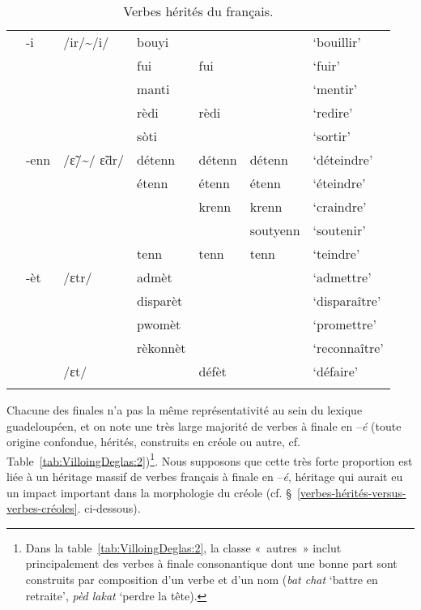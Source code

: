 \documentclass[output=paper]{langsci/langscibook}
\begin{document}
\begin{table}
{\begin{tabular}[c]{lllllll}
  \cline{2-7}
  & -i & /ir/\textasciitilde{}/i/ & bouyi& & &  `bouillir' \\
  & & & fui  & fui  &&`fuir'\\
  & & & manti  & &&`mentir'\\
  & & & rèdi  & rèdi &&`redire'\\
  & & & sòti  & &&`sortir'\\

  \cline{2-7}
  & -enn & /ɛ̃/\textasciitilde{}/ ɛ̃dr/ & détenn  & détenn
 & détenn &`déteindre'\\
  & & & étenn  & étenn & étenn
  & `éteindre'\\
  & & & & krenn & krenn &`craindre'\\
  & & & & & soutyenn &`soutenir'\\
  & & & tenn & tenn & tenn &`teindre'\\

  \cline{2-7}
  & -èt & /ɛtr/ & admèt  & & & `admettre'\\
  & & & disparèt  & & & `disparaître'\\
  & & & pwomèt  & & & `promettre'\\
  & & & rèkonnèt  & & & `reconnaître'\\
  & & /ɛt/ & & défèt  & & `défaire'\\
  \lspbottomrule
\end{tabular}}
\caption{Verbes hérités du français.}
\label{tab:VilloingDeglas:1}
\end{table}


Chacune des finales n'a pas la même représentativité au sein du lexique
guadeloupéen, et on note une très large majorité de verbes à finale en
--\emph{é} (toute origine confondue, hérités, construits en créole ou
autre, cf. Table~\ref{tab:VilloingDeglas:2})\footnote{Dans la table~\ref{tab:VilloingDeglas:2}, la classe «~autres~» inclut principalement des verbes à
    finale consonantique dont une bonne part sont construits par
    composition d'un verbe et d'un nom (\emph{bat chat} `battre en
    retraite', \emph{pèd lakat} `perdre la tête).}. Nous supposons que cette très forte proportion
est liée à un héritage massif de verbes français à finale en --\emph{é},
héritage qui aurait eu un impact important dans la morphologie du créole
(cf. §~\ref{verbes-hérités-versus-verbes-créoles}. ci-dessous).
\end{document}
